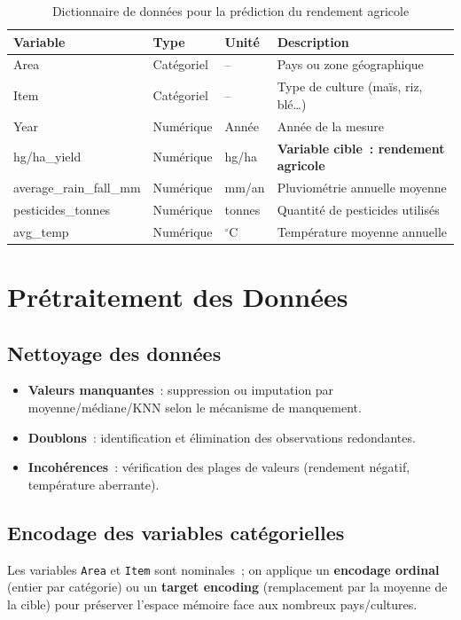 \begin{table}[H]
\centering
\caption{Dictionnaire de données pour la prédiction du rendement agricole}
\label{tab:dictionnaire-donnees}
\renewcommand{\arraystretch}{1.4}
\begin{tabularx}{\textwidth}{|>{\ttfamily}p{3.5cm}|p{2.2cm}|p{2cm}|X|}
\hline
\rowcolor{TableHeader}\textbf{Variable} & \textbf{Type} & \textbf{Unité} & \textbf{Description} \\
\hline
Area & Catégoriel & -- & Pays ou zone géographique \\
\hline
Item & Catégoriel & -- & Type de culture (maïs, riz, blé\ldots) \\
\hline
Year & Numérique & Année & Année de la mesure \\
\hline
hg/ha\_yield & Numérique & hg/ha & \textbf{Variable cible~: rendement agricole} \\
\hline
average\_rain\_fall\_mm & Numérique & mm/an & Pluviométrie annuelle moyenne \\
\hline
pesticides\_tonnes & Numérique & tonnes & Quantité de pesticides utilisés \\
\hline
avg\_temp & Numérique & $^\circ$C & Température moyenne annuelle \\
\hline
\end{tabularx}
\end{table}

\section{Prétraitement des Données}

\subsection{Nettoyage des données}
\begin{itemize}[leftmargin=1.5cm, itemsep=3pt]
  \item \textbf{Valeurs manquantes}~: suppression ou imputation par moyenne/médiane/KNN selon le mécanisme de manquement.
  \item \textbf{Doublons}~: identification et élimination des observations redondantes.
  \item \textbf{Incohérences}~: vérification des plages de valeurs (rendement négatif, température aberrante).
\end{itemize}

\subsection{Encodage des variables catégorielles}
Les variables \texttt{Area} et \texttt{Item} sont nominales~; on applique un \textbf{encodage ordinal} (entier par catégorie) ou un \textbf{target encoding} (remplacement par la moyenne de la cible) pour préserver l'espace mémoire face aux nombreux pays/cultures.

